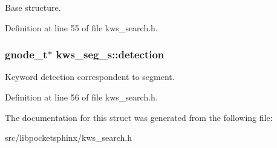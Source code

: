 Base structure. 



Definition at line 55 of file kws\+\_\+search.\+h.

\subsubsection[{detection}]{\setlength{\rightskip}{0pt plus 5cm}gnode\+\_\+t$\ast$ kws\+\_\+seg\+\_\+s\+::detection}\label{structkws__seg__s_a5de99d98b2be6e0348033c9fc05ec139}


Keyword detection correspondent to segment. 



Definition at line 56 of file kws\+\_\+search.\+h.



The documentation for this struct was generated from the following file\+:\begin{DoxyCompactItemize}
\item 
src/libpocketsphinx/kws\+\_\+search.\+h\end{DoxyCompactItemize}
